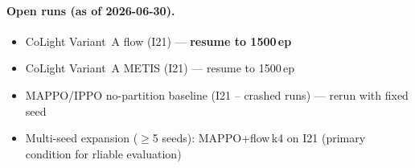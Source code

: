 \documentclass{article}
\begin{document}
\paragraph{Open runs (as of 2026-06-30).}
\begin{itemize}
    \item CoLight Variant~A flow (I21) --- \textbf{resume to 1500\,ep}
    \item CoLight Variant~A METIS (I21) --- resume to 1500\,ep
    \item MAPPO/IPPO no-partition baseline (I21 -- crashed runs)
    --- rerun with fixed seed
    \item Multi-seed expansion ($\geq$5 seeds): MAPPO+flow\,k4 on I21
    (primary condition for rliable evaluation)
\end{itemize}
\end{document}
